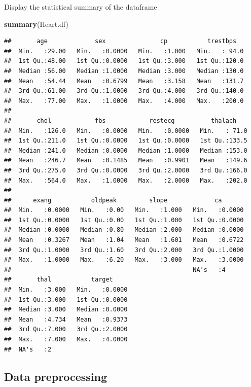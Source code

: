 \documentclass[
]{article}
\newenvironment{Shaded}{\begin{snugshade}}{\end{snugshade}}
\newcommand{\FunctionTok}[1]{\textcolor[rgb]{0.13,0.29,0.53}{\textbf{#1}}}
\newcommand{\NormalTok}[1]{#1}
\begin{document}
Display the statistical summary of the dataframe

\begin{Shaded}
\begin{Highlighting}[]
\FunctionTok{summary}\NormalTok{(Heart.df)}
\end{Highlighting}
\end{Shaded}

\begin{verbatim}
##       age             sex               cp           trestbps    
##  Min.   :29.00   Min.   :0.0000   Min.   :1.000   Min.   : 94.0  
##  1st Qu.:48.00   1st Qu.:0.0000   1st Qu.:3.000   1st Qu.:120.0  
##  Median :56.00   Median :1.0000   Median :3.000   Median :130.0  
##  Mean   :54.44   Mean   :0.6799   Mean   :3.158   Mean   :131.7  
##  3rd Qu.:61.00   3rd Qu.:1.0000   3rd Qu.:4.000   3rd Qu.:140.0  
##  Max.   :77.00   Max.   :1.0000   Max.   :4.000   Max.   :200.0  
##                                                                  
##       chol            fbs            restecg          thalach     
##  Min.   :126.0   Min.   :0.0000   Min.   :0.0000   Min.   : 71.0  
##  1st Qu.:211.0   1st Qu.:0.0000   1st Qu.:0.0000   1st Qu.:133.5  
##  Median :241.0   Median :0.0000   Median :1.0000   Median :153.0  
##  Mean   :246.7   Mean   :0.1485   Mean   :0.9901   Mean   :149.6  
##  3rd Qu.:275.0   3rd Qu.:0.0000   3rd Qu.:2.0000   3rd Qu.:166.0  
##  Max.   :564.0   Max.   :1.0000   Max.   :2.0000   Max.   :202.0  
##                                                                   
##      exang           oldpeak         slope             ca        
##  Min.   :0.0000   Min.   :0.00   Min.   :1.000   Min.   :0.0000  
##  1st Qu.:0.0000   1st Qu.:0.00   1st Qu.:1.000   1st Qu.:0.0000  
##  Median :0.0000   Median :0.80   Median :2.000   Median :0.0000  
##  Mean   :0.3267   Mean   :1.04   Mean   :1.601   Mean   :0.6722  
##  3rd Qu.:1.0000   3rd Qu.:1.60   3rd Qu.:2.000   3rd Qu.:1.0000  
##  Max.   :1.0000   Max.   :6.20   Max.   :3.000   Max.   :3.0000  
##                                                  NA's   :4       
##       thal           target      
##  Min.   :3.000   Min.   :0.0000  
##  1st Qu.:3.000   1st Qu.:0.0000  
##  Median :3.000   Median :0.0000  
##  Mean   :4.734   Mean   :0.9373  
##  3rd Qu.:7.000   3rd Qu.:2.0000  
##  Max.   :7.000   Max.   :4.0000  
##  NA's   :2
\end{verbatim}

\subsection{Data preprocessing}\label{data-preprocessing}
\end{document}
